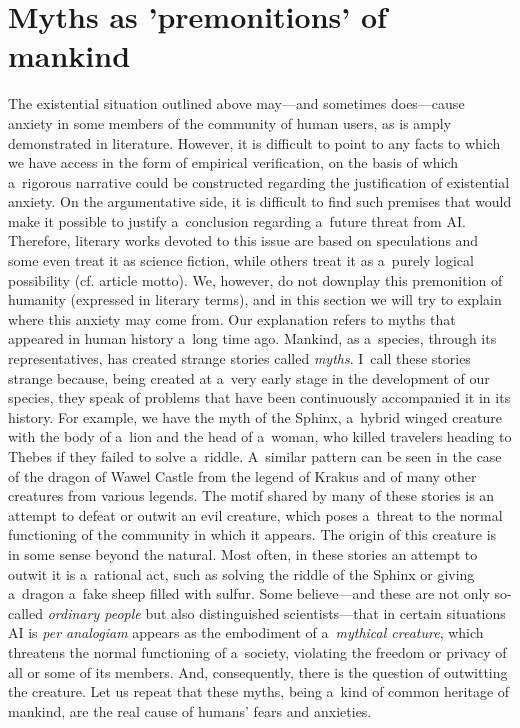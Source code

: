 \section{Myths as 'premonitions' of mankind}
The existential situation outlined above may—and sometimes does—cause anxiety in some members of the community of human users, as is amply demonstrated in literature. However, it is difficult to point to any facts to which we have access in the form of empirical verification, on the basis of which a~rigorous narrative could be constructed regarding the justification of existential anxiety. On the argumentative side, it is difficult to find such premises that would make it possible to justify a~conclusion regarding a~future threat from AI. Therefore, literary works devoted to this issue are based on speculations and some even treat it as science fiction, while others treat it as a~purely logical possibility (cf. article motto). We, however, do not downplay this premonition of humanity (expressed in literary terms), and in this section we will try to explain where this anxiety may come from. Our explanation refers to myths that appeared in human history a~long time ago. Mankind, as a~species, through its representatives, has created strange stories called \textit{myths}. I~call these stories strange because, being created at a~very early stage in the development of our species, they speak of problems that have been continuously accompanied it in its history. For example, we have the myth of the Sphinx, a~hybrid winged creature with the body of a~lion and the head of a~woman, who killed travelers heading to Thebes if they failed to solve a~riddle. A~similar pattern can be seen in the case of the dragon of Wawel Castle from the legend of Krakus and of many other creatures from various legends. The motif shared by many of these stories is an attempt to defeat or outwit an evil creature, which poses a~threat to the normal functioning of the community in which it appears. The origin of this creature is in some sense beyond the natural. Most often, in these stories an attempt to outwit it is a~rational act, such as solving the riddle of the Sphinx or giving a~dragon a~fake sheep filled with sulfur. Some believe—and these are not only so-called \textit{ordinary people} but also distinguished scientists—that in certain situations AI is \textit{per analogiam} appears as the embodiment of a~\textit{mythical creature}, which threatens the normal functioning of a~society, violating the freedom or privacy of all or some of its members. And, consequently, there is the question of outwitting the creature. Let us repeat that these myths, being a~kind of common heritage of mankind, are the real cause of humans' fears and anxieties.

